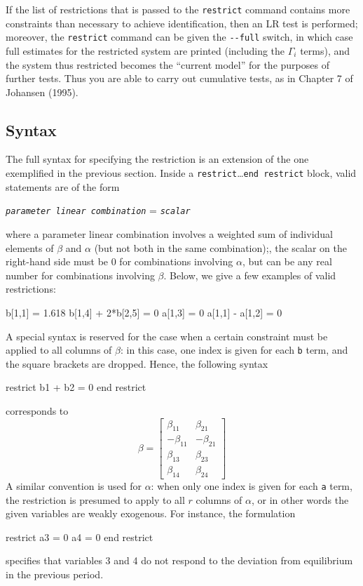 If the list of restrictions that is passed to the \texttt{restrict}
command contains more constraints than necessary to achieve
identification, then an LR test is performed; moreover, the
\texttt{restrict} command can be given the \verb|--full| switch, in
which case full estimates for the restricted system are printed
(including the $\Gamma_i$ terms), and the system thus restricted
becomes the ``current model'' for the purposes of further tests.  Thus
you are able to carry out cumulative tests, as in Chapter 7 of
Johansen (1995).

\subsection{Syntax}
\label{sec:vecm-restr-syntax}

The full syntax for specifying the restriction is an extension of the
one exemplified in the previous section. Inside a
\texttt{restrict}\ldots\texttt{end restrict} block, valid statements
are of the form
\begin{center}
  \texttt{\emph{parameter linear combination}} = \emph{\texttt{scalar}}
\end{center}
where a parameter linear combination involves a weighted sum of
individual elements of $\beta$ and $\alpha$ (but not both in the same
combination);, the scalar on the right-hand side must be 0 for
combinations involving $\alpha$, but can be any real number for
combinations involving $\beta$. Below, we give a few examples of valid
restrictions:
\begin{code}
  b[1,1] = 1.618
  b[1,4] + 2*b[2,5] = 0
  a[1,3] = 0
  a[1,1] - a[1,2] = 0
\end{code}

A special syntax is reserved for the case when a certain constraint
must be applied to all columns of $\beta$: in this case, one index is
given for each \texttt{b} term, and the square brackets are dropped.
Hence, the following syntax
\begin{code}
restrict
  b1 + b2 = 0
end restrict
\end{code}
corresponds to
\[
\beta = \left[
\begin{array}{rr}
\beta_{11} & \beta_{21} \\
-\beta_{11} & -\beta_{21} \\
\beta_{13} & \beta_{23} \\
\beta_{14} & \beta_{24}
\end{array}
\right]
\]
A similar convention is used for $\alpha$: when only one index is given for
each \texttt{a} term, the restriction is presumed to apply to all $r$
columns of $\alpha$, or in other words the given variables are weakly
exogenous. For instance, the formulation
%
\begin{code}
restrict
  a3 = 0
  a4 = 0
end restrict
\end{code}
%
specifies that variables 3 and 4 do not respond to the deviation from
equilibrium in the previous period.  


